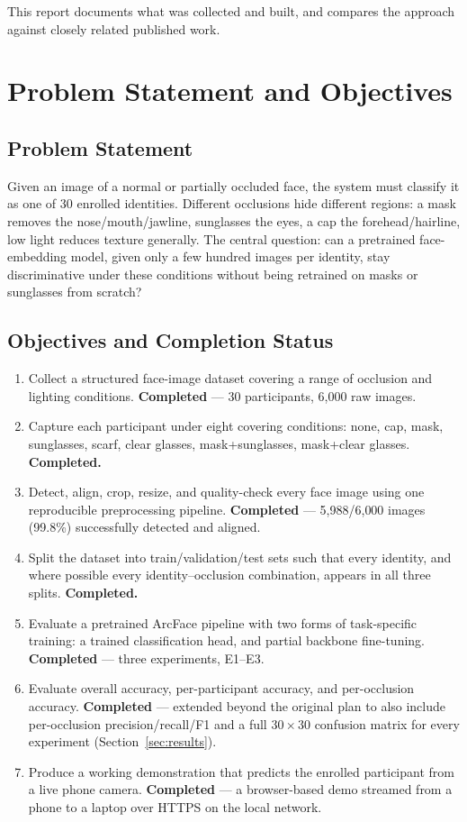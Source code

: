 \documentclass[11pt]{article}
\begin{document}
This report documents what was collected and built, and compares the approach against closely related published work.

\section{Problem Statement and Objectives}

\subsection{Problem Statement}

Given an image of a normal or partially occluded face, the system must classify it as one of 30 enrolled identities. Different occlusions hide different regions: a mask removes the nose/mouth/jawline, sunglasses the eyes, a cap the forehead/hairline, low light reduces texture generally. The central question: can a pretrained face-embedding model, given only a few hundred images per identity, stay discriminative under these conditions without being retrained on masks or sunglasses from scratch?

\subsection{Objectives and Completion Status}

\begin{enumerate}[label=\arabic*.]
\item Collect a structured face-image dataset covering a range of occlusion and lighting conditions. \textbf{Completed} — 30 participants, 6{,}000 raw images.
\item Capture each participant under eight covering conditions: none, cap, mask, sunglasses, scarf, clear glasses, mask+sunglasses, mask+clear glasses. \textbf{Completed.}
\item Detect, align, crop, resize, and quality-check every face image using one reproducible preprocessing pipeline. \textbf{Completed} — 5{,}988/6{,}000 images (99.8\%) successfully detected and aligned.
\item Split the dataset into train/validation/test sets such that every identity, and where possible every identity--occlusion combination, appears in all three splits. \textbf{Completed.}
\item Evaluate a pretrained ArcFace pipeline with two forms of task-specific training: a trained classification head, and partial backbone fine-tuning. \textbf{Completed} — three experiments, E1--E3.
\item Evaluate overall accuracy, per-participant accuracy, and per-occlusion accuracy. \textbf{Completed} — extended beyond the original plan to also include per-occlusion precision/recall/F1 and a full $30\times30$ confusion matrix for every experiment (Section~\ref{sec:results}).
\item Produce a working demonstration that predicts the enrolled participant from a live phone camera. \textbf{Completed} — a browser-based demo streamed from a phone to a laptop over HTTPS on the local network.
\end{enumerate}
\end{document}
